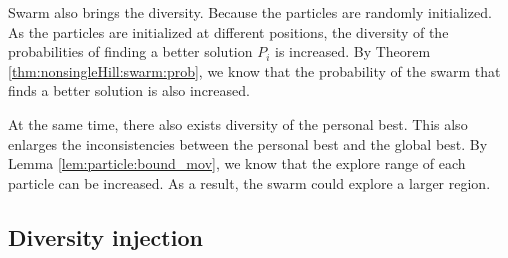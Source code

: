 Swarm also brings the diversity.
Because the particles are randomly initialized.
As the particles are initialized at different positions, the diversity of the probabilities of finding a better solution $ P_{i} $ is increased.
By Theorem \ref{thm:nonsingleHill:swarm:prob}, we know that the probability of the swarm that finds a better solution is also increased.

At the same time, there also exists diversity of the personal best.
This also enlarges the inconsistencies between the personal best and the global best.
By Lemma \ref{lem:particle:bound_mov}, we know that the explore range of each particle can be increased.
As a result, the swarm could explore a larger region.


\subsection{Diversity injection}

